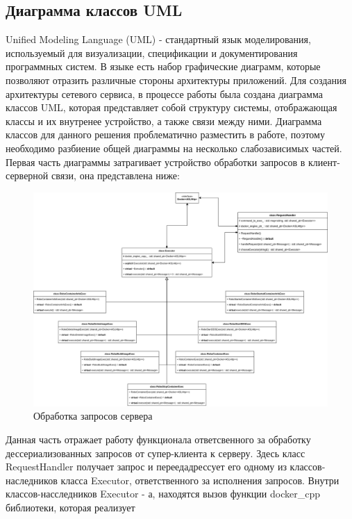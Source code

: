 \documentclass[a4paper, 14pt]{extreport}
\begin{document}
\subsection{Диаграмма классов UML}
\par Unified Modeling Language (UML) - стандартный язык моделирования, используемый для визуализации, спецификации и документирования 
программных систем. В языке есть набор графические диаграмм, которые позволяют отразить различные стороны архитектуры приложений. 
Для создания архитектуры сетевого сервиса, в процессе работы была создана диаграмма классов UML, которая представляет собой структуру 
системы, отображающая классы и их внутренее устройство, а также связи между ними. Диаграмма классов для данного решения проблематично 
разместить в работе, поэтому необходимо разбиение общей диаграммы на несколько слабозависимых частей. Первая часть диаграммы затрагивает 
устройство обработки запросов в клиент-серверной связи, она представлена ниже:
\begin{figure}[ht]
\begin{center}
\includegraphics[scale = 0.33]{./figure/client-serv-UML}
\caption{Обработка запросов сервера}
\label{fig:manip_photo}
\end{center}
\end{figure}
\par Данная часть отражает работу функционала ответсвенного за обработку дессериализованных запросов от супер-клиента к серверу. 
Здесь класс RequestHandler получает запрос и переедадрессует его одному из классов-наследников класса Executor, ответственного за 
исполнения запросов. Внутри классов-насследников Executor - а, находятся вызов функции docker\_cpp библиотеки, которая реализует 
\end{document}
